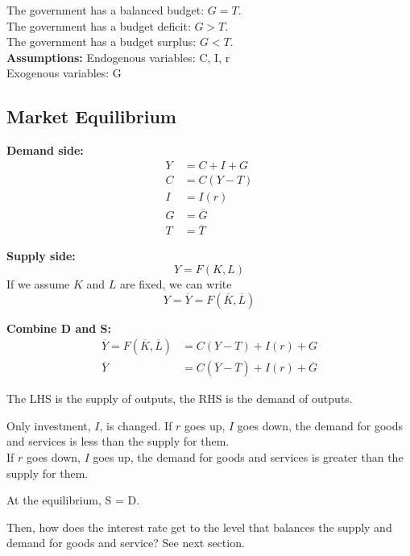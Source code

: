 \documentclass[12pt]{article}
\begin{document}
The government has a balanced budget: $ G = T $.\\
The government has a budget deficit: $ G > T $.\\
The government has a budget surplus: $ G < T $.\\

{\textbf {Assumptions:}}
Endogenous variables: C, I, r\\
Exogenous variables: G



\subsection{Market Equilibrium}

{\textbf {Demand side:}}
\begin{align*}
Y &= C + I + G\\
C &= C(Y - T)\\
I &= I(r)\\
G &=  \overline{G}\\
T &=  \overline{T}
\end{align*}


{\textbf {Supply side:}}
\begin{equation*}
Y = F(K,L)
\end{equation*}
If we assume $ K $ and $ L $ are fixed, we can write
\begin{equation*}
Y =  \overline{Y} = F( \overline{K},  \overline{L})
\end{equation*}

{\textbf {Combine D and S:}}
\begin{align*}
\overline{Y} = F( \overline{K},  \overline{L}) &= C(Y - T) + I(r) + G\\
\overline{Y} &= C( \overline{Y} -  \overline{T}) + I(r) +  \overline{G}
\end{align*}

The LHS is the supply of outputs, the RHS is the demand of outputs.

Only investment, $ I $, is changed. 
If $ r $ goes up, $ I $ goes down, the demand for goods and services is less than the
supply for them.\\
If $ r $ goes down, $ I $ goes up, the demand for goods and services is greater than the
supply for them.

At the equilibrium, S = D.

Then, how does the interest rate get to the level that balances the supply and demand
for goods and service? See next section.
\end{document}
